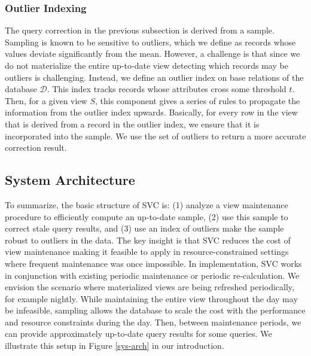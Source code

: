 \subsubsection{Outlier Indexing}
The query correction in the previous subsection is derived from a sample.
Sampling is known to be sensitive to outliers, which we define as records whose values deviate significantly from the mean.
However, a challenge is that since we do not materialize the entire up-to-date view detecting which records may be outliers is challenging.
Instead, we define an outlier index on base relations of the database $\mathcal{D}$.
This index tracks records whose attributes cross some threshold $t$.
Then, for a given view $S$, this component gives a series of rules to propagate the information from the outlier index upwards.
Basically, for every row in the view that is derived from a record in the outlier index, we ensure that it is incorporated into the sample.
We use the set of outliers to return a more accurate correction result.

\subsection{System Architecture}
To summarize, the basic structure of SVC is: (1) analyze a view maintenance procedure to efficiently compute an up-to-date sample, (2) use this sample to correct stale query results, and (3) use an index of outliers make the sample robust to outliers in the data. 
The key insight is that SVC reduces the cost of view maintenance making it feasible to apply in resource-constrained settings where frequent maintenance was once impossible.
In implementation, SVC works in conjunction with existing periodic maintenance or periodic re-calculation.
We envision the scenario where materialized views are being refreshed periodically, for example nightly.
While maintaining the entire view throughout the day may be infeasible, sampling allows the database to scale the cost with the performance and resource constraints during the day.
Then, between maintenance periods, we can provide approximately up-to-date query results for some queries.
We illustrate this setup in Figure \ref{sys-arch} in our introduction.
 
